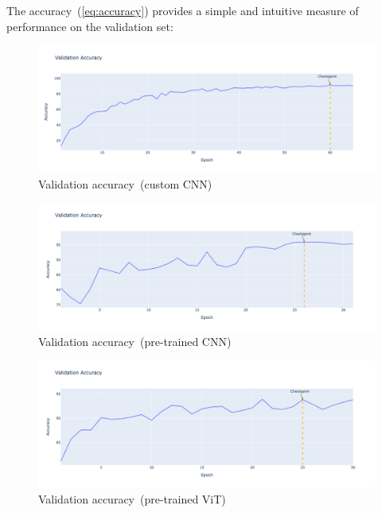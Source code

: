 The accuracy~(\ref{eq:accuracy}) provides a simple and intuitive measure of performance on the validation set:

\begin{figure}[htbp]
    \centerline{\includegraphics[width=0.9\linewidth]{../../resources/custom_cnn/accuracy.png}}
    \caption{Validation accuracy~(custom CNN)}
    \label{fig:accuracy-custom-cnn}
\end{figure}

\begin{figure}[htbp]
    \centerline{\includegraphics[width=0.9\linewidth]{../../resources/resnet/accuracy.png}}
    \caption{Validation accuracy~(pre-trained CNN)}
    \label{fig:accuracy-pretrained-cnn}
\end{figure}

\begin{figure}[htbp]
    \centerline{\includegraphics[width=0.9\linewidth]{../../resources/vit/accuracy.png}}
    \caption{Validation accuracy~(pre-trained ViT)}
    \label{fig:accuracy-pretrained-vit}
\end{figure}

